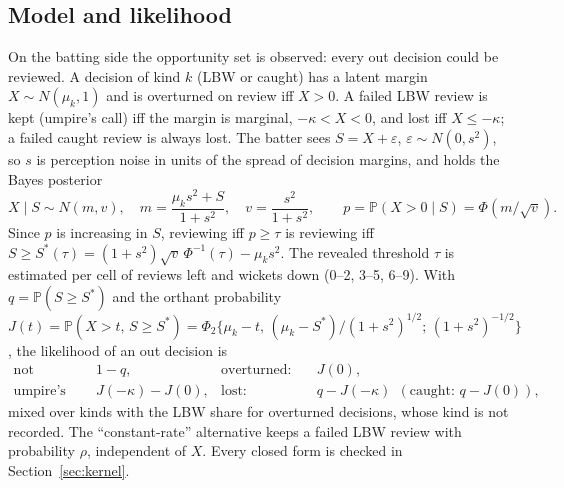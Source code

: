 \documentclass[aoas]{imsart}
\theoremstyle{plain}
\theoremstyle{definition}
\newcommand{\Prob}{\mathbb{P}}
\begin{document}
\begin{table}[!htbp]
\caption{DRS data. DRS matches include the zero-review matches of DRS series (Section~\ref{sec:drs}). Batting-side out decisions are every LBW, caught or caught-and-bowled out decision, including those
overturned on review.}\label{tab:drsdata}
\centering\small

\end{table}

\subsection{Model and likelihood}
On the batting side the opportunity set is observed: every out decision could be reviewed. A decision of kind $k$
(LBW or caught) has a latent margin $X\sim N(\mu_k,1)$ and is overturned on review iff $X>0$. A failed LBW review is
kept (umpire's call) iff the margin is marginal, $-\kappa<X<0$, and lost iff $X\le-\kappa$; a failed caught review is
always lost. The batter sees $S=X+\varepsilon$, $\varepsilon\sim N(0,s^2)$, so $s$ is perception noise in units of the
spread of decision margins, and holds the Bayes posterior
\[ X\mid S\sim N(m,v),\quad m=\frac{\mu_ks^2+S}{1+s^2},\quad v=\frac{s^2}{1+s^2},\qquad p=\Prob(X>0\mid S)=\Phi(m/\sqrt v). \]
Since $p$ is increasing in $S$, reviewing iff $p\ge\tau$ is reviewing iff $S\ge S^*(\tau)=(1+s^2)\sqrt v\,
\Phi^{-1}(\tau)-\mu_ks^2$. The revealed threshold $\tau$ is estimated per cell of reviews left and wickets down (0--2,
3--5, 6--9). With $q=\Prob(S\ge S^*)$ and the orthant probability
$J(t)=\Prob(X>t,\,S\ge S^*)=\Phi_2\{\mu_k-t,\,(\mu_k-S^*)/(1+s^2)^{1/2};\,(1+s^2)^{-1/2}\}$, the likelihood of an out
decision is
\begin{align*}
\text{not reviewed:}&\quad 1-q, & \text{overturned:}&\quad J(0),\\
\text{umpire's call:}&\quad J(-\kappa)-J(0), & \text{lost:}&\quad q-J(-\kappa)\ \ (\text{caught: } q-J(0)),
\end{align*}
mixed over kinds with the LBW share for overturned decisions, whose kind is not recorded. The ``constant-rate''
alternative keeps a failed LBW review with probability $\rho$, independent of $X$. Every closed form is checked in
Section~\ref{sec:kernel}.
\end{document}
